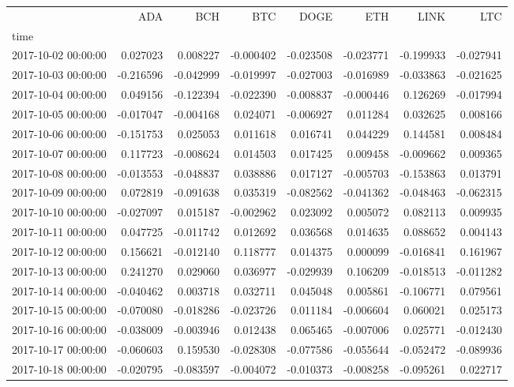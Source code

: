 \begin{tabular}{lrrrrrrr}
\toprule
 & ADA & BCH & BTC & DOGE & ETH & LINK & LTC \\
time &  &  &  &  &  &  &  \\
\midrule
2017-10-02 00:00:00 & 0.027023 & 0.008227 & -0.000402 & -0.023508 & -0.023771 & -0.199933 & -0.027941 \\
2017-10-03 00:00:00 & -0.216596 & -0.042999 & -0.019997 & -0.027003 & -0.016989 & -0.033863 & -0.021625 \\
2017-10-04 00:00:00 & 0.049156 & -0.122394 & -0.022390 & -0.008837 & -0.000446 & 0.126269 & -0.017994 \\
2017-10-05 00:00:00 & -0.017047 & -0.004168 & 0.024071 & -0.006927 & 0.011284 & 0.032625 & 0.008166 \\
2017-10-06 00:00:00 & -0.151753 & 0.025053 & 0.011618 & 0.016741 & 0.044229 & 0.144581 & 0.008484 \\
2017-10-07 00:00:00 & 0.117723 & -0.008624 & 0.014503 & 0.017425 & 0.009458 & -0.009662 & 0.009365 \\
2017-10-08 00:00:00 & -0.013553 & -0.048837 & 0.038886 & 0.017127 & -0.005703 & -0.153863 & 0.013791 \\
2017-10-09 00:00:00 & 0.072819 & -0.091638 & 0.035319 & -0.082562 & -0.041362 & -0.048463 & -0.062315 \\
2017-10-10 00:00:00 & -0.027097 & 0.015187 & -0.002962 & 0.023092 & 0.005072 & 0.082113 & 0.009935 \\
2017-10-11 00:00:00 & 0.047725 & -0.011742 & 0.012692 & 0.036568 & 0.014635 & 0.088652 & 0.004143 \\
2017-10-12 00:00:00 & 0.156621 & -0.012140 & 0.118777 & 0.014375 & 0.000099 & -0.016841 & 0.161967 \\
2017-10-13 00:00:00 & 0.241270 & 0.029060 & 0.036977 & -0.029939 & 0.106209 & -0.018513 & -0.011282 \\
2017-10-14 00:00:00 & -0.040462 & 0.003718 & 0.032711 & 0.045048 & 0.005861 & -0.106771 & 0.079561 \\
2017-10-15 00:00:00 & -0.070080 & -0.018286 & -0.023726 & 0.011184 & -0.006604 & 0.060021 & 0.025173 \\
2017-10-16 00:00:00 & -0.038009 & -0.003946 & 0.012438 & 0.065465 & -0.007006 & 0.025771 & -0.012430 \\
2017-10-17 00:00:00 & -0.060603 & 0.159530 & -0.028308 & -0.077586 & -0.055644 & -0.052472 & -0.089936 \\
2017-10-18 00:00:00 & -0.020795 & -0.083597 & -0.004072 & -0.010373 & -0.008258 & -0.095261 & 0.022717 \\

\end{tabular}
